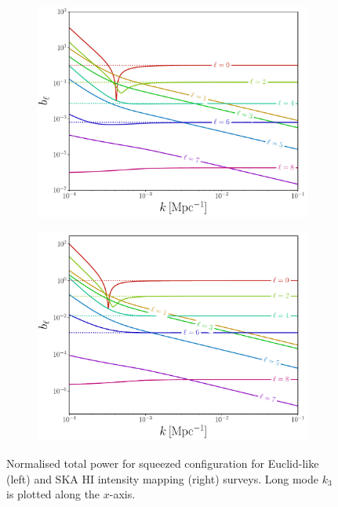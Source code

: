 {\clearpage
\begin{figure}[ht]
\begin{subfigure}{0.5\textwidth}
\includegraphics[width=0.85\linewidth]{fig/totP_Euclid_sq2.pdf}
\end{subfigure}%
\begin{subfigure}{0.5\textwidth}
\includegraphics[width=0.85\linewidth]{fig/totP_IM_sq2.pdf}
\end{subfigure}
\caption{Normalised total power for squeezed configuration for Euclid-like (left) and SKA HI intensity mapping (right) surveys. Long mode \(k_3\) is plotted along the \(x\)-axis. \label{fig:totpowersq}}
\end{figure}
\begin{figure}[ht]
\begin{subfigure}{0.5\textwidth}

\end{subfigure}
\end{figure}}
